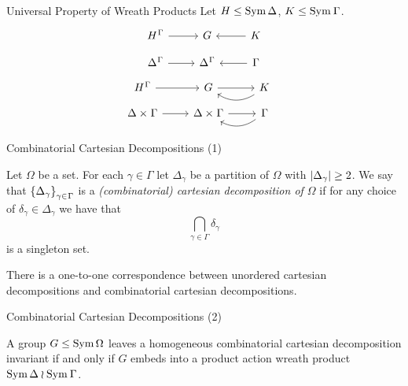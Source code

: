 \begin{frame}{Universal Property of Wreath Products}
    Let $H \leq \operatorname{Sym} \Delta$, $K \leq \sym \Gamma$.
    \[
    \begin{tikzcd}[ampersand replacement=\&, row sep=small]
        H ^ \Gamma
            \ar[r]
        \&
        G
        \&
        K
            \ar[l]
        \\
        \Delta ^ \Gamma
            \ar[r]
        \&
        \Delta ^ \Gamma
        \&
        \Gamma
            \ar[l]
    \end{tikzcd}
    \]
    \pause
    \vspace{1em}
    \[
    \hspace{-1em}
    \begin{tikzcd}[ampersand replacement=\&, row sep=small]
        H ^ \Gamma
            \ar[r]
        \&
        G
            \ar[r]
        \&
        K
            \ar[bend left=33]{l}
        \\
        \Delta \times \Gamma
            \ar[r]
        \&
        \Delta \times \Gamma
            \ar[r]
        \&
        \Gamma
            \ar[bend left=33]{l}
    \end{tikzcd}
    \]
\end{frame}

\begin{frame}{Combinatorial Cartesian Decompositions (1)}
    \begin{defn}
        Let $\Omega$ be a set.
        For each $\gamma \in \Gamma$ let $\Delta_\gamma$ be a partition of
        $\Omega$ with $ \left| \Delta_\gamma \right|  \geq 2$.
        We say that $\set{ \Delta_\gamma }_{\gamma \in \Gamma}$ is a
        \emph{(combinatorial) cartesian decomposition of $\Omega$}
        if
        \pause
        for any choice of $\delta_\gamma \in \Delta_\gamma$
        we have that
        \[
            \bigcap_{\gamma \in \Gamma} \delta_\gamma
        \]
        is a singleton set.
    \end{defn}
    \pause

    \begin{lemma}
        There is a one-to-one correspondence between
        unordered cartesian decompositions
        and combinatorial cartesian decompositions.
    \end{lemma}
\end{frame}

\begin{frame}{Combinatorial Cartesian Decompositions (2)}
    \begin{thm}
        A group $G \leq \operatorname{Sym} \Omega$ leaves a homogeneous combinatorial
        cartesian decomposition invariant
        if and only if
        $G$ embeds into a product action wreath product
        $\sym \Delta \wr \sym \Gamma$.
    \end{thm}
\end{frame}

